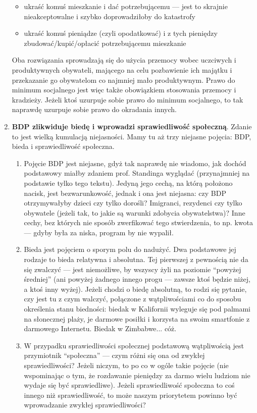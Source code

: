 \documentclass[11pt]{article}
\begin{document}
\begin{enumerate}
		\begin{itemize}
			\item ukraść komuś mieszkanie i dać potrzebującemu — jest to skrajnie nieakceptowalne i szybko doprowadziłoby do katastrofy
			\item ukraść komuś pieniądze (czyli opodatkować) i z tych pieniędzy zbudować/kupić/opłacić potrzebującemu mieszkanie
		\end{itemize}
		\par Oba rozwiązania sprowadzają się do użycia przemocy wobec uczciwych i produktywnych obywateli, mającego na celu pozbawienie ich majątku i przekazanie go obywatelom co najmniej mało produktywnym. Prawo do minimum socjalnego jest więc także obowiązkiem stosowania przemocy i kradzieży. Jeżeli ktoś uzurpuje sobie prawo do minimum socjalnego, to tak naprawdę uzurpuje sobie prawo do okradania innych.
		\item \textbf{BDP zlikwiduje biedę i wprowadzi sprawiedliwość społeczną}. Zdanie to jest wielką kumulacją niejasności. Mamy tu aż trzy niejasne pojęcia: BDP, bieda i sprawiedliwość społeczna.
		\begin{enumerate}[label=(\alph*)]
			\item Pojęcie BDP jest niejasne, gdyż tak naprawdę nie wiadomo, jak dochód podstawowy miałby zdaniem prof. Standinga wyglądać (przynajmniej na podstawie tylko tego tekstu). Jedyną jego cechą, na którą położono nacisk, jest bezwarunkowość, jednak i ona jest niejasna: czy BDP otrzymywałyby dzieci czy tylko dorośli? Imigranci, rezydenci czy tylko obywatele (jeżeli tak, to jakie są warunki zdobycia obywatelstwa)? Inne cechy, bez których nie sposób zwerfikować tego stwierdzenia, to np. kwota — gdyby była za niska, program by nie wypalił.
			\item Bieda jest pojęciem o sporym polu do nadużyć. Dwa podstawowe jej rodzaje to bieda relatywna i absolutna. Tej pierwszej z pewnością nie da się zwalczyć — jest niemożliwe, by wszyscy żyli na poziomie ``powyżej średniej'' (ani powyżej żadnego innego progu — zawsze ktoś będzie niżej, a ktoś inny wyżej). Jeżeli chodzi o biedę absolutną, to rodzi się pytanie, czy jest tu z czym walczyć, połączone z wątpliwościami co do sposobu określenia stanu biedności: biedak w Kalifornii wyleguje się pod palmami na słonecznej plaży, je darmowe posiłki i korzysta na swoim smartfonie z darmowego Internetu. Biedak w Zimbabwe... cóż.
			\item W przypadku sprawiedliwości społecznej podstawową wątpliwością jest przymiotnik ``społeczna'' — czym różni się ona od zwykłej sprawiedliwości? Jeżeli niczym, to po co w ogóle takie pojęcie (nie wspominając o tym, że rozdawanie pieniędzy za darmo wielu ludziom nie wydaje się być sprawiedliwe). Jeżeli sprawiedliwość społeczna to coś innego niż sprawiedliwość, to może naszym priorytetem powinno być wprowadzanie zwykłej sprawiedliwości?

\end{enumerate}
\end{enumerate}
\end{document}
